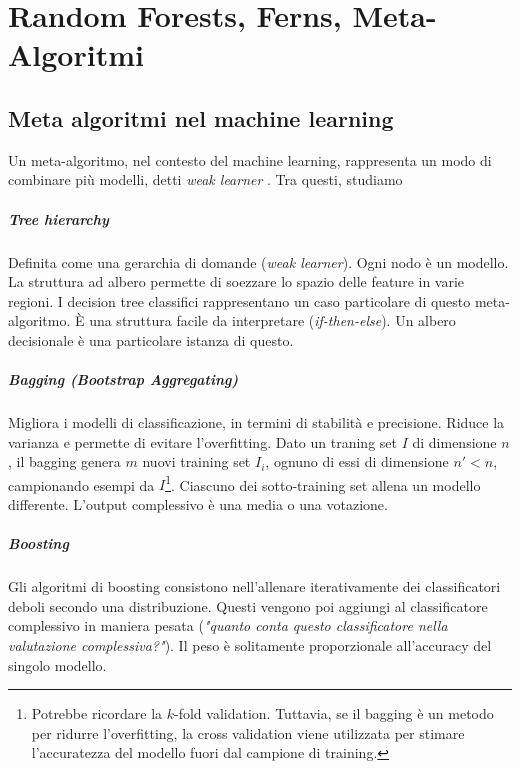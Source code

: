 \chapter{Random Forests, Ferns, Meta-Algoritmi}

\section{Meta algoritmi nel machine learning}
Un meta-algoritmo, nel contesto del machine learning, rappresenta un modo di combinare più modelli, detti \textit{weak learner} .
Tra questi, studiamo

\paragraph{Tree hierarchy} Definita come una gerarchia di domande (\textit{weak learner}). Ogni nodo è un modello. La struttura ad albero permette di soezzare lo spazio delle feature in varie regioni. I decision tree classifici rappresentano un caso particolare di questo meta-algoritmo. È una struttura facile da interpretare (\textit{if-then-else}). Un albero decisionale è una particolare istanza di questo.

\paragraph{Bagging (Bootstrap Aggregating)} Migliora i modelli di classificazione, in termini di stabilità e precisione. Riduce la varianza e permette di evitare l'overfitting.
Dato un traning set $I$ di dimensione $n$, il bagging genera $m$ nuovi training set $I_i$, ognuno di essi di dimensione $n' < n$, campionando esempi da $I$\footnote{Potrebbe ricordare la $k$-fold validation. Tuttavia, se il bagging  è un metodo per ridurre l'overfitting, la cross validation viene utilizzata per stimare l'accuratezza del modello fuori dal campione di training.}. Ciascuno dei sotto-training set allena un modello differente. L'output complessivo è una media o una votazione.

\paragraph{Boosting} Gli algoritmi di boosting consistono nell'allenare iterativamente dei classificatori deboli secondo una distribuzione. Questi vengono poi aggiungi al classificatore complessivo in maniera pesata (\textit{"quanto conta questo classificatore nella valutazione complessiva?"}). Il peso è solitamente proporzionale all'accuracy del singolo modello.


